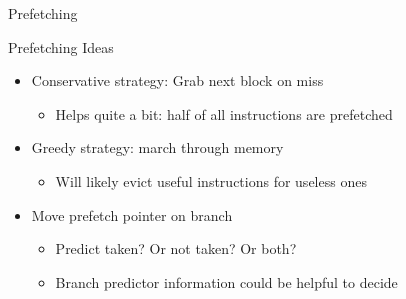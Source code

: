 \documentclass[table,dvipsnames]{beamer}
\begin{document}
\begin{frame}[fragile]{Prefetching}
	\begin{block}{Prefetching Ideas}
	\begin{itemize}
		\item Conservative strategy: Grab next block on miss
		\begin{itemize} \item Helps quite a bit: half of all instructions are prefetched \end{itemize}
		\item Greedy strategy: march through memory
		\begin{itemize} \item Will likely evict useful instructions for useless ones \end{itemize}
		\item Move prefetch pointer on branch
			\begin{itemize} \item Predict taken? Or not taken? Or both? 
			\item Branch predictor information could be helpful to decide
			\end{itemize}
	\end{itemize}
	\end{block}	
\end{frame}
\end{document}
